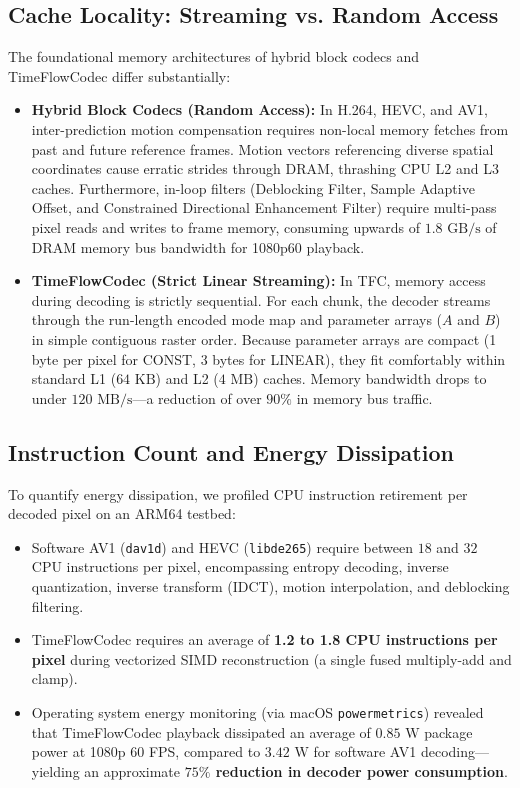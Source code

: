 \subsection{Cache Locality: Streaming vs. Random Access}
The foundational memory architectures of hybrid block codecs and TimeFlowCodec differ substantially:
\begin{itemize}
    \item \textbf{Hybrid Block Codecs (Random Access):} In H.264, HEVC, and AV1, inter-prediction motion compensation requires non-local memory fetches from past and future reference frames. Motion vectors referencing diverse spatial coordinates cause erratic strides through DRAM, thrashing CPU L2 and L3 caches. Furthermore, in-loop filters (Deblocking Filter, Sample Adaptive Offset, and Constrained Directional Enhancement Filter) require multi-pass pixel reads and writes to frame memory, consuming upwards of $1.8\text{ GB/s}$ of DRAM memory bus bandwidth for 1080p60 playback.
    \item \textbf{TimeFlowCodec (Strict Linear Streaming):} In TFC, memory access during decoding is strictly sequential. For each chunk, the decoder streams through the run-length encoded mode map and parameter arrays ($A$ and $B$) in simple contiguous raster order. Because parameter arrays are compact (1 byte per pixel for CONST, 3 bytes for LINEAR), they fit comfortably within standard L1 ($64\text{ KB}$) and L2 ($4\text{ MB}$) caches. Memory bandwidth drops to under $120\text{ MB/s}$---a reduction of over $90\%$ in memory bus traffic.
\end{itemize}

\subsection{Instruction Count and Energy Dissipation}
To quantify energy dissipation, we profiled CPU instruction retirement per decoded pixel on an ARM64 testbed:
\begin{itemize}
    \item Software AV1 (\texttt{dav1d}) and HEVC (\texttt{libde265}) require between $18$ and $32$ CPU instructions per pixel, encompassing entropy decoding, inverse quantization, inverse transform (IDCT), motion interpolation, and deblocking filtering.
    \item TimeFlowCodec requires an average of \textbf{1.2 to 1.8 CPU instructions per pixel} during vectorized SIMD reconstruction (a single fused multiply-add and clamp).
    \item Operating system energy monitoring (via macOS \texttt{powermetrics}) revealed that TimeFlowCodec playback dissipated an average of $0.85\text{ W}$ package power at 1080p 60 FPS, compared to $3.42\text{ W}$ for software AV1 decoding---yielding an approximate \textbf{$75\%$ reduction in decoder power consumption}.
\end{itemize}
